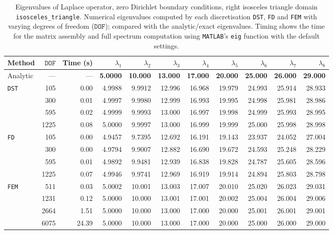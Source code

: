%

\begin{table}[htbp]
  \centering
  {\scriptsize
  \begin{tabular}{lrrrrrrrrrr}
    \toprule
    Method & $\mathtt{DOF}$ & Time (s) & $\lambda_{1}$ & $\lambda_{2}$ & $\lambda_{3}$ & $\lambda_{4}$ & $\lambda_{5}$ & $\lambda_{6}$ & $\lambda_{7}$ & $\lambda_{8}$ \\
    \midrule
    Analytic & --- & --- & \textbf{5.0000} & \textbf{10.000} & \textbf{13.000} & \textbf{17.000} & \textbf{20.000} & \textbf{25.000} & \textbf{26.000} & \textbf{29.000} \\
    \midrule
    \multirow{4}{*}{\texttt{DST}} & 105 & 0.00 & 4.9988 & 9.9912 & 12.996 & 16.968 & 19.979 & 24.993 & 25.914 & 28.933 \\
     & 300 & 0.01 & 4.9997 & 9.9980 & 12.999 & 16.993 & 19.995 & 24.998 & 25.981 & 28.986 \\
     & 595 & 0.02 & 4.9999 & 9.9993 & 13.000 & 16.997 & 19.998 & 24.999 & 25.993 & 28.995 \\
     & 1225 & 0.08 & 5.0000 & 9.9997 & 13.000 & 16.999 & 19.999 & 25.000 & 25.998 & 28.998 \\
    \midrule
    \multirow{4}{*}{\texttt{FD}} & 105 & 0.00 & 4.9457 & 9.7395 & 12.692 & 16.191 & 19.143 & 23.937 & 24.052 & 27.004 \\
     & 300 & 0.00 & 4.9794 & 9.9007 & 12.882 & 16.690 & 19.672 & 24.593 & 25.248 & 28.229 \\
     & 595 & 0.01 & 4.9892 & 9.9481 & 12.939 & 16.838 & 19.828 & 24.787 & 25.605 & 28.596 \\
     & 1225 & 0.07 & 4.9946 & 9.9741 & 12.969 & 16.919 & 19.914 & 24.894 & 25.803 & 28.798 \\
    \midrule
    \multirow{4}{*}{\texttt{FEM}} & 511 & 0.03 & 5.0002 & 10.001 & 13.003 & 17.007 & 20.010 & 25.020 & 26.023 & 29.031 \\
     & 1231 & 0.12 & 5.0000 & 10.000 & 13.001 & 17.001 & 20.002 & 25.004 & 26.004 & 29.006 \\
     & 2664 & 1.51 & 5.0000 & 10.000 & 13.000 & 17.000 & 20.000 & 25.001 & 26.001 & 29.001 \\
     & 6075 & 24.39 & 5.0000 & 10.000 & 13.000 & 17.000 & 20.000 & 25.000 & 26.000 & 29.000 \\
    \bottomrule
  \end{tabular}}
  \caption{Eigenvalues of Laplace operator, zero Dirichlet boundary conditions, right isosceles triangle domain \texttt{isosceles\_triangle}. Numerical eigenvalues computed by each discretisation \texttt{DST}, \texttt{FD} and \texttt{FEM} with varying degrees of freedom ($\mathtt{DOF}$); compared with the analytic/exact eigenvalues. Timing shows the time for the matrix assembly and full spectrum computation using \texttt{MATLAB}'s \lstinline{eig} function with the default settings.}
  \label{tab:eigenvalues_head_isosceles_triangle}
\end{table}
